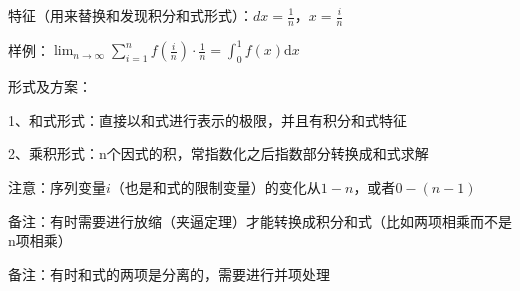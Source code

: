 特征（用来替换和发现积分和式形式）：$dx=\frac{1}{n}$，$x=\frac{i}{n}$

样例：$\lim _{n \rightarrow \infty} \sum_{i=1}^{n} f\left(\frac{i}{n}\right) \cdot \frac{1}{n}=\int_{0}^{1} f(x) \mathrm{d} x$

形式及方案：

1、和式形式：直接以和式进行表示的极限，并且有积分和式特征

2、乘积形式：n个因式的积，常指数化之后指数部分转换成和式求解

注意：序列变量$i$（也是和式的限制变量）的变化从$1-n$，或者$0-(n-1)$

备注：有时需要进行放缩（夹逼定理）才能转换成积分和式（比如两项相乘而不是n项相乘）

备注：有时和式的两项是分离的，需要进行并项处理



